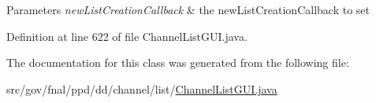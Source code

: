 \begin{DoxyParams}{Parameters}
{\em new\-List\-Creation\-Callback} & the new\-List\-Creation\-Callback to set \\
\hline
\end{DoxyParams}


Definition at line 622 of file Channel\-List\-G\-U\-I.\-java.



The documentation for this class was generated from the following file\-:\begin{DoxyCompactItemize}
\item 
src/gov/fnal/ppd/dd/channel/list/\hyperlink{ChannelListGUI_8java}{Channel\-List\-G\-U\-I.\-java}\end{DoxyCompactItemize}
